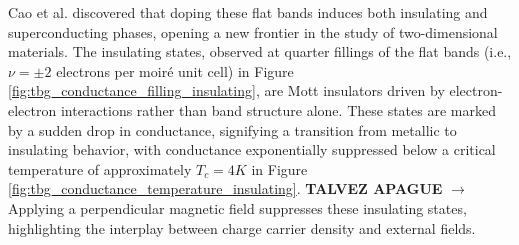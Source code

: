 Cao et al. \cite{cao2018, cao2018_correlated} discovered that doping these flat bands induces both insulating and superconducting phases, opening a new frontier in the study of two-dimensional materials. The insulating states, observed at quarter fillings of the flat bands (i.e., \(\nu = \pm 2\) electrons per moiré unit cell) in Figure \ref{fig:tbg_conductance_filling_insulating}, are Mott insulators driven by electron-electron interactions rather than band structure alone. These states are marked by a sudden drop in conductance, signifying a transition from metallic to insulating behavior, with conductance exponentially suppressed below a critical temperature of approximately $T_c = 4 \unit{K}$ in Figure \ref{fig:tbg_conductance_temperature_insulating}. \textbf{TALVEZ APAGUE} $\bm{\rightarrow}$ Applying a perpendicular magnetic field suppresses these insulating states, highlighting the interplay between charge carrier density and external fields.

